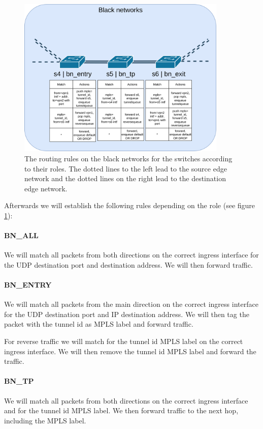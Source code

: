 \begin{figure}[ht]
  \centering
  \includegraphics[width=10cm]{images/chapter_6/routing_bn.png}
  \caption[Routing on the black networks]{The routing rules on the black networks for the switches according to their roles. The dotted lines to the left lead to the source edge network and the dotted lines on the right lead to the destination edge network.}
  \label{fig:routing_bn}
\end{figure}

Afterwards we will establish the following rules depending on the role (see figure \ref{fig:routing_bn}):

\paragraph{BN\_ALL} We will match all packets from both directions on the correct ingress interface for the UDP destination port and destination address. We will then forward traffic.

\paragraph{BN\_ENTRY} We will match all packets from the main direction on the correct ingress interface for the UDP destination port and IP destination address. We will then tag the packet with the tunnel id as MPLS label and forward traffic.

For reverse traffic we will match for the tunnel id MPLS label on the correct ingress interface. We will then remove the tunnel id MPLS label and forward the traffic.

\paragraph{BN\_TP} We will match all packets from both directions on the correct ingress interface and for the tunnel id MPLS label. We then forward traffic to the next hop, including the MPLS label.

